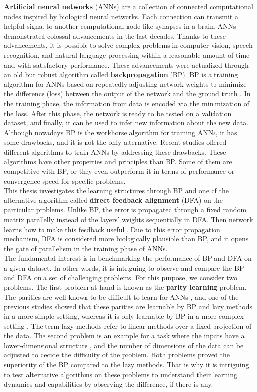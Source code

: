 \documentclass[a4paper, nobind]{templates/ociamthesis}
\begin{document}
\textbf{Artificial neural networks} (ANNs) are a collection of connected computational nodes inspired by biological neural networks. Each connection can transmit a helpful signal to another computational node like synapses in a brain. ANNs demonstrated colossal advancements in the last decades. Thanks to these advancements, it is possible to solve complex problems in computer vision, speech recognition, and natural language processing within a reasonable amount of time and with satisfactory performance. These advancements were actualized through an old but robust algorithm called \textbf{backpropagation} (BP). BP is a training algorithm for ANNs based on repeatedly adjusting network weights to minimize the difference (loss) between the output of the network and the ground truth \cite{Rumelhart:1986we}. In the training phase, the information from data is encoded via the minimization of the loss. After this phase, the network is ready to be tested on a validation dataset, and finally, it can be used to infer new information about the new data.\\
Although nowadays BP is the workhorse algorithm for training ANNs, it has some drawbacks, and it is not the only alternative. Recent studies offered different algorithms to train ANNs by addressing these drawbacks. These algorithms have other properties and principles than BP. Some of them are competitive with BP, or they even outperform it in terms of performance or convergence speed for specific problems.\\
This thesis investigates the learning structures through BP and one of the alternative algorithm called \textbf{direct feedback alignment} (DFA) on the particular problems. Unlike BP, the error is propagated through a fixed random matrix parallelly instead of the layers' weights sequentially in DFA. Then network learns how to make this feedback useful \cite{nøkland2016direct}. Due to this error propagation mechanism, DFA is considered more biologically plausible than BP, and it opens the gate of parallelism in the training phase of ANNs.\\
The fundamental interest is in benchmarking the performance of BP and DFA on a given dataset. In other words, it is intriguing to observe and compare the BP and DFA on a set of challenging problems. For this purpose, we consider two problems. The first problem at hand is known as the \textbf{parity learning} problem. The parities are well-known to be difficult to learn for ANNs \cite{DBLP:journals/corr/abs-1807-06399}, and one of the previous studies showed that these parities are learnable by BP and lazy methods in a more simple setting, whereas it is only learnable by BP in a more complex setting \cite{DBLP:journals/corr/abs-2002-07400}. The term lazy methods refer to linear methods over a fixed projection of the data. The second problem is an example for a task where the inputs have a lower-dimensional structure \cite{chizat2020implicit}, and the number of dimensions of the data can be adjusted to decide the difficulty of the problem. Both problems proved the superiority of the BP compared to the lazy methods. That is why it is intriguing to test alternative algorithms on these problems to understand their learning dynamics and capabilities by observing the difference, if there is any.\\
\end{document}
